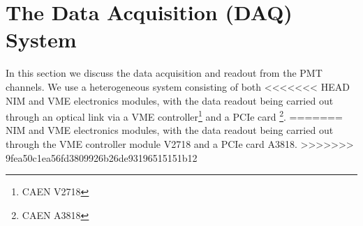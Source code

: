 \section{The Data Acquisition (DAQ) System }
\label{sec:DAQ}


 In this section we discuss the data acquisition and readout from the PMT 
channels. We use a heterogeneous system consisting of both 
<<<<<<< HEAD
NIM and VME electronics modules, with the data readout being carried out 
through an optical link via a VME controller\footnote{CAEN V2718} and a 
PCIe card \footnote{CAEN A3818}. 
=======
NIM and VME electronics modules, with the data readout being carried out through the VME controller module V2718 and a PCIe card A3818. 
>>>>>>> 9fea50c1ea56fd3809926b26de93196515151b12

